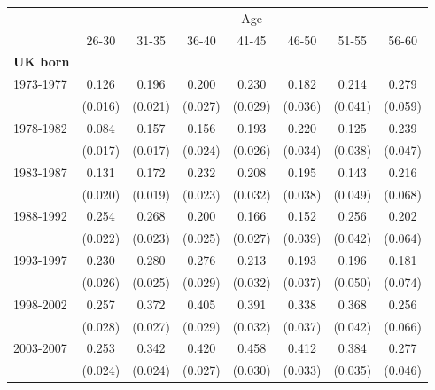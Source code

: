 {\def\sym#1{\ifmmode^{#1}\else\(^{#1}\)\fi} \begin{tabular}{l*{7}{c}} \toprule  &\multicolumn{7}{c}{Age}\\ \cmidrule{2-8}
               &\multicolumn{1}{c}{26-30}&\multicolumn{1}{c}{31-35}&\multicolumn{1}{c}{36-40}&\multicolumn{1}{c}{41-45}&\multicolumn{1}{c}{46-50}&\multicolumn{1}{c}{51-55}&\multicolumn{1}{c}{56-60}\\
\midrule \textbf{UK born}\\
1973-1977      &          0.126&          0.196&          0.200&          0.230&          0.182&          0.214&          0.279\\
               &        (0.016)&        (0.021)&        (0.027)&        (0.029)&        (0.036)&        (0.041)&        (0.059)\\
1978-1982           &       0.084&       0.157&       0.156&       0.193&       0.220&       0.125&       0.239\\
                    &     (0.017)&     (0.017)&     (0.024)&     (0.026)&     (0.034)&     (0.038)&     (0.047)\\
1983-1987           &       0.131&       0.172&       0.232&       0.208&       0.195&       0.143&       0.216\\
                    &     (0.020)&     (0.019)&     (0.023)&     (0.032)&     (0.038)&     (0.049)&     (0.068)\\
1988-1992           &       0.254&       0.268&       0.200&       0.166&       0.152&       0.256&       0.202\\
                    &     (0.022)&     (0.023)&     (0.025)&     (0.027)&     (0.039)&     (0.042)&     (0.064)\\
1993-1997           &       0.230&       0.280&       0.276&       0.213&       0.193&       0.196&       0.181\\
                    &     (0.026)&     (0.025)&     (0.029)&     (0.032)&     (0.037)&     (0.050)&     (0.074)\\
1998-2002           &       0.257&       0.372&       0.405&       0.391&       0.338&       0.368&       0.256\\
                    &     (0.028)&     (0.027)&     (0.029)&     (0.032)&     (0.037)&     (0.042)&     (0.066)\\
2003-2007           &       0.253&       0.342&       0.420&       0.458&       0.412&       0.384&       0.277\\
                    &     (0.024)&     (0.024)&     (0.027)&     (0.030)&     (0.033)&     (0.035)&     (0.046)\\

\end{tabular}}
